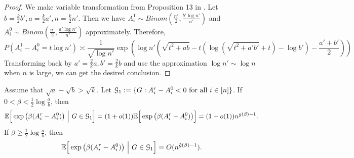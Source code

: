 \documentclass{article}
\begin{document}
\begin{proof}
We make variable transformation from Proposition 13 in \cite{ye2020exact}.
Let $b = \frac{k}{2}b', a=\frac{k}{2}a', n = \frac{k}{2}n'$.
Then we have $A_i^1 \sim Binom(\frac{n'}{2}, \frac{b' \log n'}{n'})$ and 
$A_i^0 \sim Binom(\frac{n'}{2}, \frac{a' \log n'}{n'})$ approximately.
Therefore, 
$$
P(A_i^1 - A_i^0 = t \log n') \asymp \frac{1}{\sqrt{\log n'}} \exp(\log n'(\sqrt{t^2+ab} - t(\log(\sqrt{t^2+a'b'}+t)-\log b') - \frac{a'+b'}{2}))
$$
Transforming back by $a'=\frac{2}{k}a, b' = \frac{2}{k}b$ and use the approximation $\log n' \sim \log n$ when $n$ is large, we can get the desired
conclusion.
\end{proof}

\begin{proposition}  \label{prop:df}
Assume that $\sqrt{a}-\sqrt{b}>\sqrt{k}$. Let $\mathcal{G}_1:=\{G:A^r_i-A^0_i<0\text{~for all~}i\in[n]\}$.
If $0<\beta<\frac{1}{2}\log\frac{a}{b}$, then
$$
\mathbb{E} \Big[  \exp\big(\beta (A^r_i-A^0_i) \big) ~\Big|~ G\in\mathcal{G}_1 \Big] 
= (1+o(1)) \mathbb{E} \Big[   \exp\big(\beta (A^r_i-A^0_i) \big) \Big]
= (1+o(1)) n^{g(\beta)-1}  .
$$
If $\beta\ge\frac{1}{2}\log\frac{a}{b}$, then
\begin{align*}
\mathbb{E} \Big[  \exp\big(\beta (A^r_i-A^0_i) \big) ~\Big|~ G\in\mathcal{G}_1 \Big] 
= O(n^{\tilde{g}(\beta)-1})  .
\end{align*}
\end{proposition}
\end{document}
